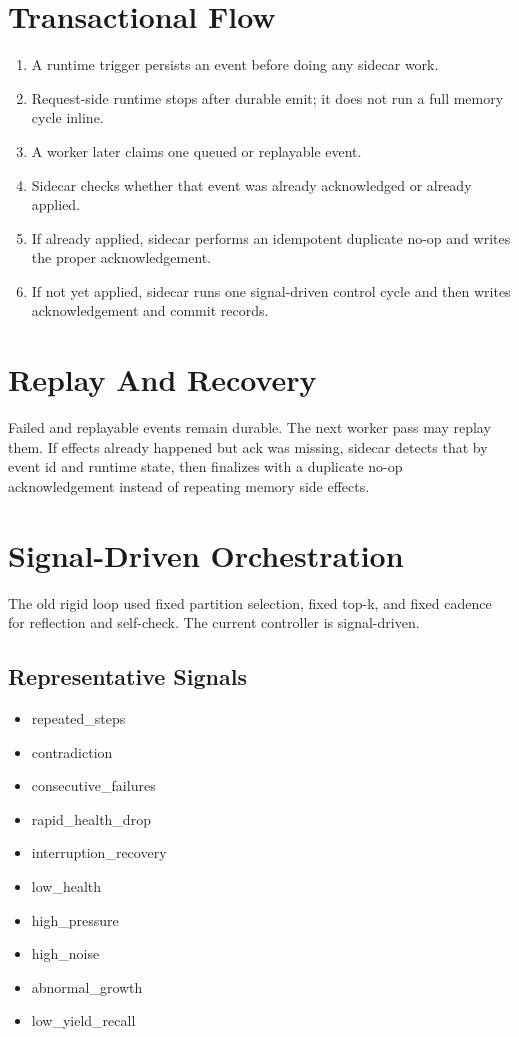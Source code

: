 \documentclass[11pt,a4paper,oneside,openany]{book}
\begin{document}
\chapter{Transactional Flow}
\begin{enumerate}
  \item A runtime trigger persists an event before doing any sidecar work.
  \item Request-side runtime stops after durable emit; it does not run a full memory cycle inline.
  \item A worker later claims one queued or replayable event.
  \item Sidecar checks whether that event was already acknowledged or already applied.
  \item If already applied, sidecar performs an idempotent duplicate no-op and writes the proper acknowledgement.
  \item If not yet applied, sidecar runs one signal-driven control cycle and then writes acknowledgement and commit records.
\end{enumerate}
\chapter{Replay And Recovery}
Failed and replayable events remain durable. The next worker pass may replay them. If effects already happened but ack was missing, sidecar detects that by event id and runtime state, then finalizes with a duplicate no-op acknowledgement instead of repeating memory side effects.
\chapter{Signal-Driven Orchestration}
The old rigid loop used fixed partition selection, fixed top-k, and fixed cadence for reflection and self-check. The current controller is signal-driven.
\section{Representative Signals}
\begin{itemize}
  \item repeated\_steps
  \item contradiction
  \item consecutive\_failures
  \item rapid\_health\_drop
  \item interruption\_recovery
  \item low\_health
  \item high\_pressure
  \item high\_noise
  \item abnormal\_growth
  \item low\_yield\_recall
\end{itemize}
\end{document}
